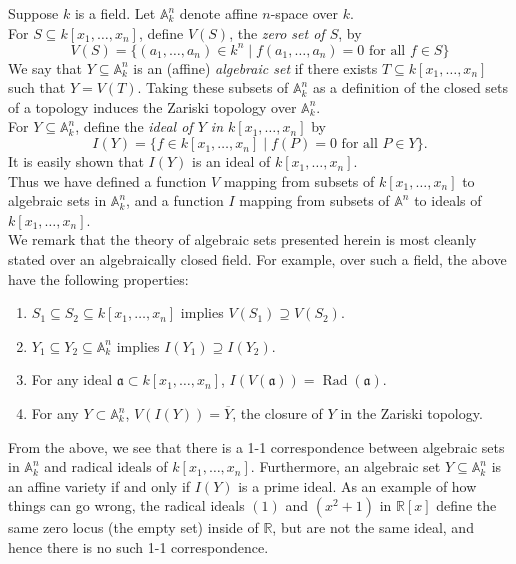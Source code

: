 \documentclass[12pt]{article}
\newcommand{\A}{\mathbb{A}}
\begin{document}
Suppose $k$ is a field.  Let $\A^n_k$ denote affine $n$-space over $k$.\\
%
For $S \subseteq k[x_1,\ldots,x_n]$, define $V(S)$, the {\em zero set of $S$}, by
\[ V(S) = \{(a_1,\ldots,a_n) \in k^n \mid f(a_1,\ldots,a_n)=0 \text{ for all } f \in S\}\]
%
We say that $Y \subseteq \A^n_k$ is an (affine) {\em algebraic set} if there exists $T \subseteq k[x_1,\ldots,x_n]$ such that $Y=V(T)$.  Taking these subsets of $\A^n_k$ as a definition of the closed sets of a topology induces the Zariski topology over $\A^n_k$.\\
%
For $Y \subseteq \A^n_k$, define the {\em {\PMlinkescapetext ideal} of $Y$ in $k[x_1,\ldots,x_n]$} by \[ I(Y)=\{f \in k[x_1,\ldots,x_n] \mid f(P)=0 \text{ for all } P \in Y\}. \]
%
It is easily shown that $I(Y)$ is an ideal of $k[x_1,\ldots,x_n]$.\\
%
Thus we have defined a function $V$ mapping from subsets of $k[x_1,\ldots,x_n]$ to algebraic sets in $\A^n_k$, and a function $I$ mapping from subsets of $\A^n$ to ideals of $k[x_1,\ldots,x_n]$.\\
%
We remark that the theory of algebraic sets presented herein is most cleanly stated over an algebraically closed field.  For example, over such a field, the above have the following properties:
\begin{enumerate}
\item $S_1 \subseteq S_2 \subseteq k[x_1,\ldots,x_n]$ implies 
      $V(S_1) \supseteq V(S_2)$.
\item $Y_1 \subseteq Y_2 \subseteq \A_k^n$ implies 
      $I(Y_1) \supseteq I(Y_2)$.
\item For any ideal $\mathfrak{a} \subset k[x_1,\ldots,x_n]$, 
      $I(V(\mathfrak{a}))=\operatorname{Rad}(\mathfrak{a})$.
\item For any $Y \subset \A^n_k$, $V(I(Y))=\overline{Y}$, the closure
      of $Y$ in the Zariski topology.
\end{enumerate}

From the above, we see that there is a 1-1 correspondence between algebraic sets in $\A^n_k$ and radical ideals of $k[x_1,\ldots,x_n]$.  Furthermore, an algebraic set $Y \subseteq \A^n_k$ is an affine variety if and only if $I(Y)$ is a prime ideal.  As an example of how things can go wrong, the radical ideals $(1)$ and $(x^2+1)$ in $\mathbb{R}[x]$ define the same zero locus (the empty set) inside of $\mathbb{R}$, but are not the same ideal, and hence there is no such 1-1 correspondence.
\end{document}
